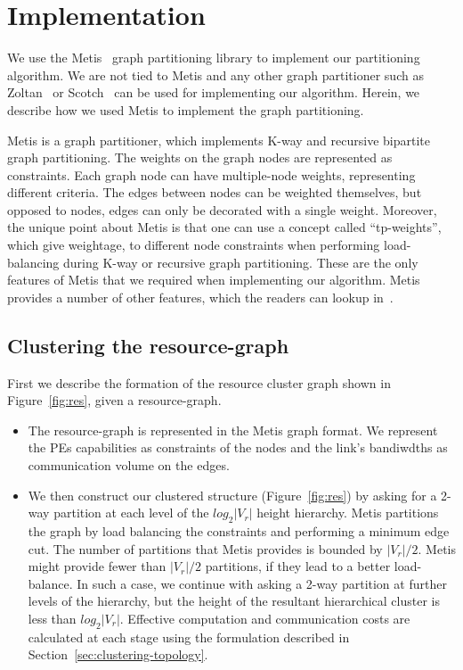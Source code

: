 \section{Implementation}
\label{sec:imple}

We use the Metis~\cite{gkar95} graph partitioning library to implement
our partitioning algorithm. We are not tied to Metis and any other graph
partitioner such as Zoltan~\cite{kdev09} or Scotch~\cite{cche08} can be
used for implementing our algorithm. Herein, we describe how we used
Metis to implement the graph partitioning.

Metis is a graph partitioner, which implements K-way and recursive
bipartite graph partitioning. The weights on the graph nodes are
represented as constraints. Each graph node can have multiple-node
weights, representing different criteria. The edges between nodes can be
weighted themselves, but opposed to nodes, edges can only be decorated
with a single weight. Moreover, the unique point about Metis is that one
can use a concept called ``tp-weights'', which give weightage, to
different node constraints when performing load-balancing during K-way
or recursive graph partitioning. These are the only features of Metis
that we required when implementing our algorithm. Metis provides a
number of other features, which the readers can lookup in~\cite{gkar95}.

\subsection{Clustering the resource-graph}
\label{sec:clust-reso-graph}

First we describe the formation of the resource cluster graph shown in
Figure~\ref{fig:res}, given a resource-graph.

\begin{itemize}


\item The resource-graph is represented in the Metis graph format. We
  represent the PEs capabilities as constraints of the nodes and the
  link's bandiwdths as communication volume on the edges.

\item We then construct our clustered structure (Figure~\ref{fig:res})
  by asking for a 2-way partition at each level of the $log_2|V_r|$
  height hierarchy. Metis partitions the graph by load balancing the
  constraints and performing a minimum edge cut. The number of
  partitions that Metis provides is bounded by $|V_r|/2$. Metis might
  provide fewer than $|V_r|/2$ partitions, if they lead to a better
  load-balance. In such a case, we continue with asking a 2-way
  partition at further levels of the hierarchy, but the height of the
  resultant hierarchical cluster is less than $log_2|V_r|$. Effective
  computation and communication costs are calculated at each stage using
  the formulation described in Section~\ref{sec:clustering-topology}.

\end{itemize}

